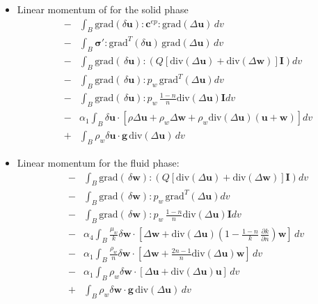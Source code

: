 \documentclass[preprint,12pt,a4paper]{elsarticle}
\begin{document}
\begin{itemize}
\item Linear momentum of for the solid phase
\begin{eqnarray} \label{eq_r1}
&-& \int_B \mbox{grad}(\delta\boldsymbol{u}):\boldsymbol{c}^{ep}:\mbox{grad}(\Delta\boldsymbol{u}) \, dv 
\nonumber \\
&-& \int_B \boldsymbol{ \sigma'}:\mbox{grad}^T(\delta\boldsymbol{u} )\, \mbox{grad}(\Delta\boldsymbol{u}) \, dv 
\nonumber \\
&-& \int_B 
\mbox{grad}(\, \delta\boldsymbol{u}) :\left(Q\left[
\mbox{div}(\Delta\boldsymbol{ u})+
\mbox{div}(\Delta\boldsymbol{w}) \right] \boldsymbol{I}\right) dv
\nonumber \\
&-& \int_B 
\mbox{grad}(\, \delta\boldsymbol{u}) : p_w \, \mbox{grad}^T(\Delta\boldsymbol{u}) dv
\nonumber \\
&-& \int_B \mbox{grad}(\, \delta\boldsymbol{u}) : p_w \,\frac{1-n}{n}\mbox{div}(\Delta\boldsymbol{u})\boldsymbol{I} dv
\nonumber \\
&-& \alpha_1\int_B \delta\boldsymbol{u} \cdot \left[\rho \Delta\boldsymbol{u} + \rho_w \Delta\boldsymbol{w} + \rho_w \mbox{div}(\Delta\boldsymbol{u})\left(\boldsymbol{u}+\boldsymbol{w}\right)\right]  dv
\nonumber \\
&+& \int_B \rho_w \delta\boldsymbol{u} \cdot \boldsymbol{g} \, \mbox{div}(\Delta\boldsymbol{u})\, dv
\end{eqnarray}
\item Linear momentum for the fluid phase:
\begin{eqnarray} \label{eq_r2}
&-&\int_B 
\mbox{grad}(\, \delta\boldsymbol{w}) :\left(Q\left[
\mbox{div}(\Delta\boldsymbol{ u})+
\mbox{div}(\Delta\boldsymbol{w}) \right] \boldsymbol{I}\right) dv
\nonumber \\
&-& \int_B 
\mbox{grad}(\, \delta\boldsymbol{w}) : p_w \, \mbox{grad}^T(\Delta\boldsymbol{u}) dv
\nonumber \\
&-&\int_B \mbox{grad}(\, \delta\boldsymbol{w}) : p_w \,\frac{1-n}{n}\mbox{div}(\Delta\boldsymbol{u})\boldsymbol{I} dv
\nonumber \\
&-& \alpha_4 \int_B \frac{\mu_w}{k} \delta \boldsymbol{w} \cdot \left[\Delta\boldsymbol{w} + \mbox{div}(\Delta\boldsymbol{u})\left(1-\frac{1-n}{k} \, \frac{\partial k}{\partial n}\right) \boldsymbol{w}\right] \, dv 
\nonumber\\
&-& \alpha_1\int_B\frac{\rho_w}{n} \delta\boldsymbol{w} \cdot \left[\Delta \boldsymbol{w} + \frac{2n-1}{n}\mbox{div}(\Delta\boldsymbol{u})\boldsymbol{w}\right] \, dv
\nonumber\\
&-& \alpha_1 \int_B \rho_w  \delta\boldsymbol{w} \cdot \left[\Delta \boldsymbol{u} +  \mbox{div}(\Delta\boldsymbol{u}) \boldsymbol{u} \right]\, dv
\nonumber\\
&+& \int_B \rho_w \delta\boldsymbol{w} \cdot \boldsymbol{g} \, \mbox{div}(\Delta\boldsymbol{u})\, dv
\end{eqnarray}\\
\end{itemize}




\end{document}
